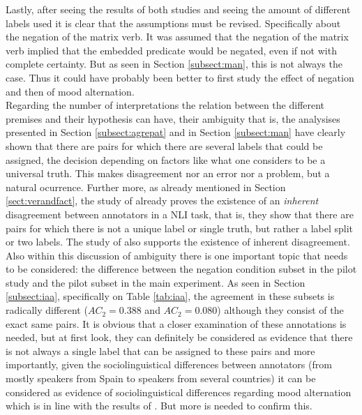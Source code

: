 Lastly, after seeing the results of both studies and seeing the amount of different labels used it is clear that the assumptions must be revised. Specifically about the negation of the matrix verb. It was assumed that the negation of the matrix verb implied that the embedded predicate would be negated, even if not with complete certainty. But as seen in Section \ref{subsect:man}, this is not always the case. Thus it could have probably been better to first study the effect of negation and then of mood alternation.\\

Regarding the number of interpretations the relation between the different premises and their hypothesis can have, their ambiguity that is, the analysises presented in Section \ref{subsect:agrepat} and in Section \ref{subsect:man} have clearly shown that there are pairs for which there are several labels that could be assigned, the decision depending on factors like what one considers to be a universal truth. This makes disagreement nor an error nor a problem, but a natural ocurrence. Further more, as already mentioned in Section \ref{sect:verandfact}, the study of \citet{pavlick2019inherent} already proves the existence of an \textit{inherent} disagreement between annotators in a NLI task, that is, they show that there are pairs for which there is not a unique label or single truth, but rather a label split or two labels. The study of \citet{nie2020can} also supports the existence of inherent disagreement.\\

Also within this discussion of ambiguity there is one important topic that needs to be considered: the difference between the negation condition subset in the pilot study and the pilot subset in the main experiment. As seen in Section \ref{subsect:iaa}, specifically on Table \ref{tab:iaa}, the agreement in these subsets is radically different ($AC_2=0.388$ and $AC_2=0.080$) although they consist of the exact same pairs. It is obvious that a closer examination of these annotations is needed, but at first look, they can definitely be considered as evidence that there is not always a single label that can be assigned to these pairs and more importantly, given the sociolinguistical differences between annotators (from mostly speakers from Spain to speakers from several countries) it can be considered as evidence of sociolinguistical differences regarding mood alternation which is in line with the results of \citet{faulkner2021systematic}. But more is needed to confirm this.\\

